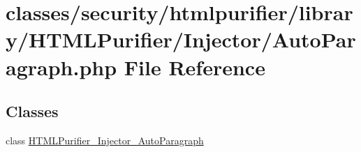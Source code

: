 \hypertarget{AutoParagraph_8php}{\section{classes/security/htmlpurifier/library/\+H\+T\+M\+L\+Purifier/\+Injector/\+Auto\+Paragraph.php File Reference}
\label{AutoParagraph_8php}
}
\subsection*{Classes}
\begin{DoxyCompactItemize}
\item 
class \hyperlink{classHTMLPurifier__Injector__AutoParagraph}{H\+T\+M\+L\+Purifier\+\_\+\+Injector\+\_\+\+Auto\+Paragraph}
\end{DoxyCompactItemize}
